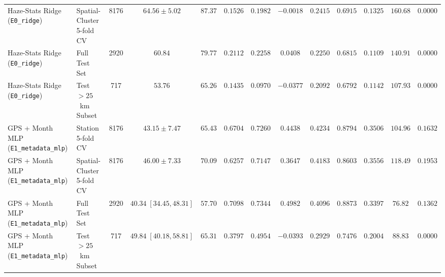 \documentclass[conference]{IEEEtran}
\begin{document}
\begin{table}[t]
{\begin{tabular}{llccccccccccc}
      Haze-Stats Ridge (\texttt{E0\_ridge})        & Spatial-Cluster 5-fold CV &       8176       &             $64.56 \pm 5.02$             &    $87.37$    &   $0.1526$    &   $0.1982$    &     $-0.0018$      &   $0.2415$   &             $0.6915$             &     $0.1325$     &     $160.68$     &    $0.0000$     \\
      Haze-Stats Ridge (\texttt{E0\_ridge})        & Full Test Set             &       2920       &                 $60.84$                  &    $79.77$    &   $0.2112$    &   $0.2258$    &      $0.0408$      &   $0.2250$   &             $0.6815$             &     $0.1109$     &     $140.91$     &    $0.0000$     \\
      Haze-Stats Ridge (\texttt{E0\_ridge})        & Test $> 25$~km Subset     &       717        &                 $53.76$                  &    $65.26$    &   $0.1435$    &   $0.0970$    &     $-0.0377$      &   $0.2092$   &             $0.6792$             &     $0.1142$     &     $107.93$     &    $0.0000$     \\
      \midrule
      GPS + Month MLP (\texttt{E1\_metadata\_mlp}) & Station 5-fold CV         &       8176       &        $\mathbf{43.15 \pm 7.47}$         &    $65.43$    &   $0.6704$    &   $0.7260$    &      $0.4438$      &   $0.4234$   &             $0.8794$             &     $0.3506$     &     $104.96$     &    $0.1632$     \\
      GPS + Month MLP (\texttt{E1\_metadata\_mlp}) & Spatial-Cluster 5-fold CV &       8176       &        $\mathbf{46.00 \pm 7.33}$         &    $70.09$    &   $0.6257$    &   $0.7147$    &      $0.3647$      &   $0.4183$   &             $0.8603$             &     $0.3556$     &     $118.49$     &    $0.1953$     \\
      GPS + Month MLP (\texttt{E1\_metadata\_mlp}) & Full Test Set             &       2920       &     $\mathbf{40.34}\;[34.45, 48.31]$     &    $57.70$    &   $0.7098$    &   $0.7344$    &      $0.4982$      &   $0.4096$   &             $0.8873$             &     $0.3397$     &     $76.82$      &    $0.1362$     \\
      GPS + Month MLP (\texttt{E1\_metadata\_mlp}) & Test $> 25$~km Subset     &       717        &     $\mathbf{49.84}\;[40.18, 58.81]$     &    $65.31$    &   $0.3797$    &   $0.4954$    & $\mathbf{-0.0393}$ &   $0.2929$   &             $0.7476$             &     $0.2004$     &     $88.83$      &    $0.0000$     \\
      \bottomrule
    \end{tabular}%
  }
\end{table}
\end{document}

